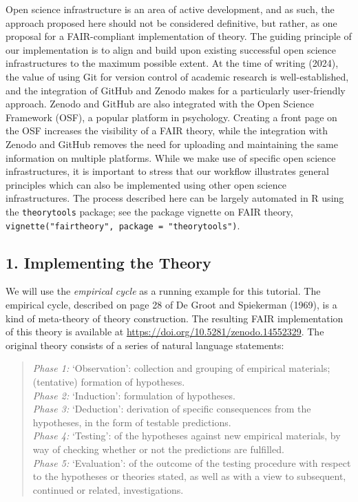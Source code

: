 \documentclass[
  man,floatsintext]{apa6}
\begin{document}
Open science infrastructure is an area of active development, and as such,
the approach proposed here should not be considered definitive,
but rather, as one proposal for a FAIR-compliant implementation of theory.
The guiding principle of our implementation is to align and build upon existing successful open science infrastructures to the maximum possible extent.
At the time of writing (2024),
the value of using Git for version control of academic research is well-established,
and the integration of GitHub and Zenodo makes for a particularly user-friendly approach.
Zenodo and GitHub are also integrated with the Open Science Framework (OSF),
a popular platform in psychology.
Creating a front page on the OSF increases the visibility of a FAIR theory,
while the integration with Zenodo and GitHub removes the need for uploading and maintaining the same information on multiple platforms.
While we make use of specific open science infrastructures, it is important to stress that our workflow illustrates general principles which can also be implemented using other open science infrastructures.
The process described here can be largely automated in R using the \texttt{theorytools} package; see the package vignette on FAIR theory, \texttt{vignette("fairtheory",\ package\ =\ "theorytools")}.

\subsection{1. Implementing the Theory}\label{implementing-the-theory}

We will use the \emph{empirical cycle} as a running example for this tutorial.
The empirical cycle, described on page 28 of De Groot and Spiekerman (1969),
is a kind of meta-theory of theory construction.
The resulting FAIR implementation of this theory is available at \url{https://doi.org/10.5281/zenodo.14552329}.
The original theory consists of a series of natural language statements:

\begin{quote}
\emph{Phase 1:} `Observation': collection and grouping of empirical materials; (tentative) formation of hypotheses.\\
\emph{Phase 2:} `Induction': formulation of hypotheses.\\
\emph{Phase 3:} `Deduction': derivation of specific consequences from the hypotheses, in the form of testable predictions.\\
\emph{Phase 4:} `Testing': of the hypotheses against new empirical materials, by way of checking whether or not the predictions are fulfilled.\\
\emph{Phase 5:} `Evaluation': of the outcome of the testing procedure with respect to the hypotheses or theories stated, as well as with a view to subsequent, continued or related, investigations.
\end{quote}
\end{document}
